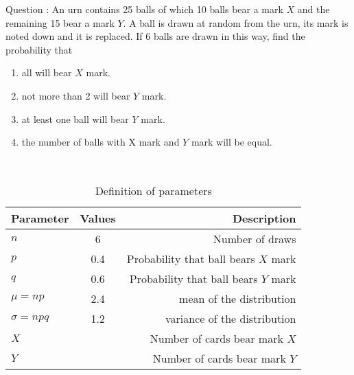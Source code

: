 \documentclass[journal,12pt,twocolumn]{IEEEtran}
\theoremstyle{remark}
\begin{document}
\let\vec\mathbf




\vspace{3cm}



\bigskip

\renewcommand{\thefigure}{\theenumi}
\renewcommand{\thetable}{\theenumi}
Question : An urn contains 25 balls of which 10 balls bear a mark $X$ and the remaining 15 bear a mark $Y$. A ball is drawn at random from the urn, its mark is noted down and it is replaced. If 6 balls are drawn in this way, find the probability that\\
\begin{enumerate}[label=(\alph*)]
\item all will bear $X$ mark.\\
\item not more than 2 will bear $Y$ mark.\\
\item at least one ball will bear $Y$ mark.\\
\item the number of balls with X mark and $Y$ mark will be equal.\\
\end{enumerate}
\solution  \\
\fi
\begin{table}[!ht]
\centering
\begin{tabular}{|l|c|r|}
    \hline
    Parameter & Values & Description\\
    \hline
    $n$ & 6 & Number of draws\\
    \hline
    $p$ & 0.4 & Probability that ball bears $X$ mark \\
    \hline
    $q$ & 0.6 & Probability that ball bears $Y$ mark \\
    \hline
    $\mu=np$ & 2.4 & mean of the distribution \\
    \hline
    $\sigma=npq $ & 1.2 & variance of the distribution\\
    \hline
    $X$ &  & Number of cards bear mark $X$ \\
    \hline
    $Y$ &  & Number of cards bear mark $Y$ \\
    \hline
\end{tabular}
\caption{Definition of parameters}
\label{tab:gaussian/9/3/17}
\end{table}
\end{document}
